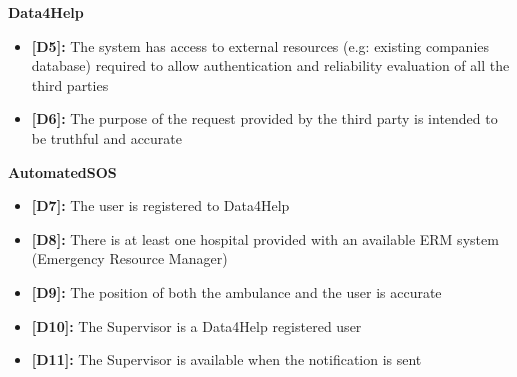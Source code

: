 \textbf{Data4Help}
\begin{itemize}
	\item \textbf{[D5]:} The system has access to external resources (e.g: existing companies database) required to allow authentication and reliability evaluation of all the third parties
	\item \textbf{[D6]:} The purpose of the request provided by the third party is intended to be truthful and accurate 
\end{itemize}
\textbf{AutomatedSOS}

\begin{itemize}
	\item\textbf{[D7]:} The user is registered to Data4Help
	\item\textbf{[D8]:} There is at least one hospital provided with an available ERM system (Emergency Resource Manager) 
	\item\textbf{[D9]:} The position of both the ambulance and the user is accurate
	\item\textbf{[D10]:} The Supervisor is a Data4Help registered user
	\item\textbf{[D11]:} The Supervisor is available when the notification is sent
\end{itemize}
\newpage